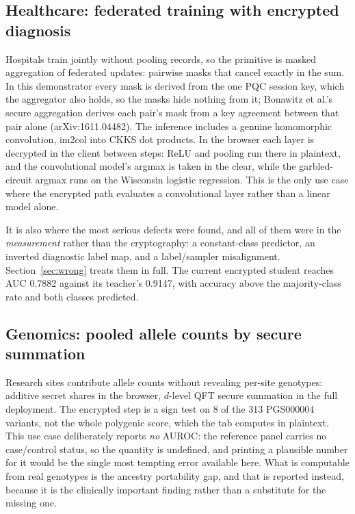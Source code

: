 \documentclass[11pt,a4paper]{article}
\begin{document}
\subsection{Healthcare: federated training with encrypted diagnosis}
Hospitals train jointly without pooling records, so the primitive is masked aggregation of federated
updates: pairwise masks that cancel exactly in the sum. In this demonstrator every mask is derived
from the one PQC session key, which the aggregator also holds, so the masks hide nothing from it;
Bonawitz et al.'s secure aggregation derives each pair's mask from a key agreement between that pair
alone (arXiv:1611.04482). The inference includes a genuine homomorphic convolution, im2col into CKKS
dot products. In the browser each layer is decrypted in the client between steps: ReLU and pooling
run there in plaintext, and the convolutional model's argmax is taken in the clear, while the
garbled-circuit argmax runs on the Wisconsin logistic regression. This is the only use case where the
encrypted path evaluates a convolutional layer rather than a linear model alone.

It is also where the most serious defects were found, and all of them were in the \emph{measurement}
rather than the cryptography: a constant-class predictor, an inverted diagnostic label map, and a
label/sampler misalignment. Section~\ref{sec:wrong} treats them in full. The current encrypted
student reaches AUC 0.7882 against its teacher's 0.9147, with accuracy above the majority-class rate
and both classes predicted.

\subsection{Genomics: pooled allele counts by secure summation}
Research sites contribute allele counts without revealing per-site genotypes: additive secret shares
in the browser, $d$-level QFT secure summation in the full deployment. The encrypted step is a sign
test on 8 of the 313 PGS000004 variants, not the whole polygenic score, which the tab computes in
plaintext. This use case deliberately reports \emph{no} AUROC: the reference panel carries no
case/control status, so the quantity is undefined, and printing a plausible number for it would be
the single most tempting error available here. What is computable from real genotypes is the
ancestry portability gap, and that is reported instead, because it is the clinically important
finding rather than a substitute for the missing one.
\end{document}
